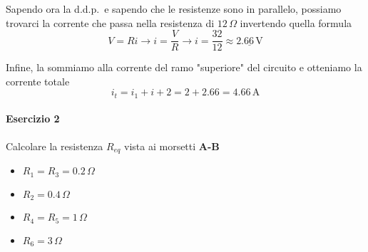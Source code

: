 Sapendo ora la d.d.p.~e sapendo che le resistenze sono in parallelo, possiamo trovarci la corrente
che passa nella resistenza di $12\,\Omega$ invertendo quella formula
\begin{equation*}
  V = Ri \rightarrow i = \frac{V}{R} \rightarrow i = \frac{32}{12} \approx \underline{2.66\,\text{V}}
\end{equation*}

Infine, la sommiamo alla corrente del ramo "superiore" del circuito e otteniamo la corrente totale
\begin{equation*}
  i_t = i_1 + i+2 = 2 + 2.66 = \boxed{4.66\,\text{A}}
\end{equation*}

\paragraph{Esercizio 2}
Calcolare la resistenza $R_{eq}$ vista ai morsetti \textbf{A-B}
\begin{multicols}{2}
  \begin{itemize}
    \item $R_1 = R_3 = 0.2\,\Omega$
    \item $R_2 = 0.4\,\Omega$
    \item $R_4 = R_5 = 1\,\Omega$
    \item $R_6 =3\,\Omega$
  \end{itemize}
\end{multicols}

\begin{center}
\end{center}
\divisor

